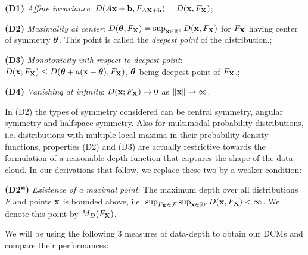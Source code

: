 \documentclass[fleqn,11pt]{article}
\begin{document}
\vspace{1em}
\noindent\textbf{(D1)} \textit{Affine invariance}: $D(A{\bf{x}} + {\bf{b}}, F_{A{\mathbf{X}}+{\bf{b}}}) = D({\bf{x}}, F_{\mathbf{X}})$;

\noindent\textbf{(D2)} \textit{Maximality at center}: $D({\boldsymbol{\theta}}, F_{\mathbf{X}}) = \sup_{{\bf{x}}\in \mathbb{R}^p} D({\bf{x}}, F_{\mathbf{X}})$ for $F_{\mathbf{X}}$ having center of symmetry ${\boldsymbol{\theta}}$. This point is called the \textit{deepest point} of the distribution.;

\noindent\textbf{(D3)} \textit{Monotonicity with respect to deepest point}: $D({\bf{x}}; F_{\mathbf{X}}) \leq D({\boldsymbol{\theta}} + a({\bf{x}} - {\boldsymbol{\theta}}), F_{\mathbf{X}})$, ${\boldsymbol{\theta}}$ being deepest point of $F_{\mathbf{X}}$.;

\noindent\textbf{(D4)} \textit{Vanishing at infinity}: $D({\bf{x}}; F_{\mathbf{X}}) \rightarrow 0$ as $\|{\bf{x}}\| \rightarrow \infty $.
\vspace{1em}

In (D2) the types of symmetry considered can be central symmetry, angular symmetry and halfspace symmetry. Also for multimodal probability distributions, i.e. distributions with multiple local maxima in their probability density functions, properties (D2) and (D3) are actually restrictive towards the formulation of a reasonable depth function that captures the shape of the data cloud. In our derivations that follow, we replace these two by a weaker condition:

\vspace{1em}
\noindent\textbf{(D2*)} \textit{Existence of a maximal point}: The maximum depth over all distributions $F$ and points ${\bf{x}}$ is bounded above, i.e. $ \sup_{F_{\mathbf{X}} \in \mathcal F} \sup_{{\bf{x}}\in \mathbb{R}^p} D({\bf{x}}, F_{\mathbf{X}}) < \infty $. We denote this point by $M_D(F_{\mathbf{X}})$.
\vspace{1em}

We will be using the following 3 measures of data-depth to obtain our DCMs and compare their performances:
\end{document}
